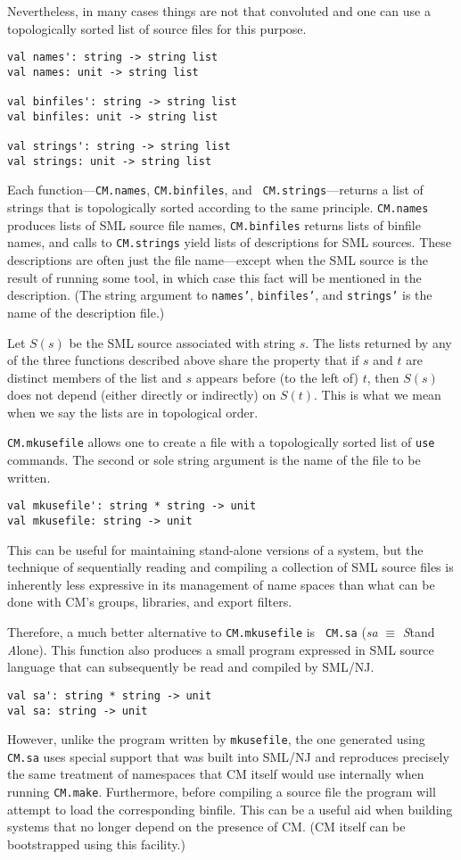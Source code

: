 \documentclass{article}
\begin{document}
Nevertheless, in many cases things are not that convoluted and one can
use a topologically sorted list of source files for this
purpose.
\begin{verbatim}
val names': string -> string list
val names: unit -> string list

val binfiles': string -> string list
val binfiles: unit -> string list

val strings': string -> string list
val strings: unit -> string list
\end{verbatim}
Each function---{\tt CM.names}, {\tt CM.binfiles}, and {\tt
CM.strings}---returns a list of strings that is topologically sorted
according to the same principle.  {\tt CM.names} produces lists of SML
source file names, {\tt CM.binfiles} returns lists of binfile names,
and calls to {\tt CM.strings} yield lists of descriptions for SML
sources.  These descriptions are often just the file name---except
when the SML source is the result of running some tool, in which case
this fact will be mentioned in the description. (The string argument
to {\tt names'}, {\tt binfiles'}, and {\tt strings'} is the name of
the description file.)

Let $S(s)$ be the SML source associated with string $s$.  The lists
returned by any of the three functions described above share the
property that if $s$ and $t$ are distinct members of the list and $s$
appears before (to the left of) $t$, then $S(s)$ does not depend
(either directly or indirectly) on $S(t)$.  This is what we mean when
we say the lists are in topological order.

{\tt CM.mkusefile} allows one to create a file with a topologically
sorted list of {\tt use} commands.  The second or sole string argument
is the name of the file to be written.
\begin{verbatim}
val mkusefile': string * string -> unit
val mkusefile: string -> unit
\end{verbatim}
This can be useful for maintaining stand-alone versions of a system,
but the technique of sequentially reading and compiling a collection
of SML source files is inherently less expressive in its management of
name spaces than what can be done with CM's groups, libraries, and
export filters.

Therefore, a much better alternative to {\tt CM.mkusefile} is {\tt
CM.sa} ({\it sa} $\equiv$ {\it S}\/tand {\it A}\/lone).  This function
also produces a small program expressed in SML source language that
can subsequently be read and compiled by SML/NJ.
\begin{verbatim}
val sa': string * string -> unit
val sa: string -> unit
\end{verbatim}
However, unlike the program written by {\tt mkusefile}, the one
generated using {\tt CM.sa} uses special support that was built into
SML/NJ and reproduces precisely the same treatment of namespaces that
CM itself would use internally when running {\tt CM.make}.
Furthermore, before compiling a source file the program will attempt
to load the corresponding binfile.  This can be a useful aid when
building systems that no longer depend on the presence of CM.  (CM
itself can be bootstrapped using this facility.)
\end{document}
